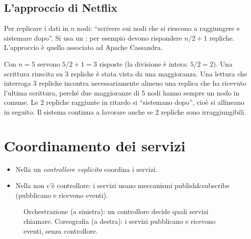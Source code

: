 \subsection{L'approccio di Netflix}

Per replicare i dati in $n$ nodi: ``scrivere sui nodi che si riescono a raggiungere e sistemare dopo''. Si usa un
: per esempio devono rispondere $n/2 + 1$ repliche. L'approccio è quello associato ad Apache
Cassandra.

\begin{esempio}
Con $n = 5$ servono $5/2 + 1 = 3$ risposte (la divisione è intera: $5/2 = 2$). Una scrittura riuscita su 3 repliche
è stata vista da una maggioranza. Una lettura che interroga 3 repliche incontra necessariamente almeno una replica
che ha ricevuto l'ultima scrittura, perché due maggioranze di 5 nodi hanno sempre un nodo in comune. Le 2 repliche
raggiunte in ritardo si ``sistemano dopo'', cioè si allineano in seguito. Il sistema continua a lavorare anche se 2
repliche sono irraggiungibili.
\end{esempio}

\section{Coordinamento dei servizi}
\label{sec:micro-coordinamento}

\begin{itemize}
  \item Nella  un \emph{controllore esplicito} coordina i servizi.
  \item Nella  non c'è controllore: i servizi usano meccanismi publish\&subscribe
    (pubblicano e ricevono eventi).
\end{itemize}

\begin{figure}[ht]
\centering
{}
\caption{Orchestrazione (a sinistra): un controllore decide quali servizi chiamare. Coreografia (a destra): i servizi
pubblicano e ricevono eventi, senza controllore.}
\label{fig:micro-coord}
\end{figure}

